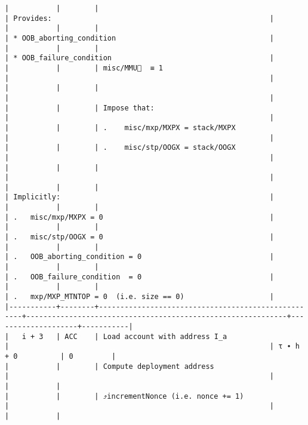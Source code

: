 \documentclass[varwidth=\maxdimen,margin=0.5cm,multi={verbatim}]{standalone}
\begin{document}
\begin{verbatim}
|           |        |                                                    | Provides:                                                   |
|           |        |                                                    | * OOB_aborting_condition                                    |
|           |        |                                                    | * OOB_failure_condition                                     |
|           |        | misc/MMU🚩  ≡ 1                                    |                                                             |
|           |        |                                                    |                                                             |
|           |        | Impose that:                                       |                                                             |
|           |        | .    misc/mxp/MXPX = stack/MXPX                    |                                                             |
|           |        | .    misc/stp/OOGX = stack/OOGX                    |                                                             |
|           |        |                                                    |                                                             |
|           |        |                                                    | Implicitly:                                                 |
|           |        |                                                    | .   misc/mxp/MXPX = 0                                       |
|           |        |                                                    | .   misc/stp/OOGX = 0                                       |
|           |        |                                                    | .   OOB_aborting_condition = 0                              |
|           |        |                                                    | .   OOB_failure_condition  = 0                              |
|           |        |                                                    | .   mxp/MXP_MTNTOP = 0  (i.e. size == 0)                    |
|-----------+--------+----------------------------------------------------+-------------------------------------------------------------+--------------------+-----------|
|   i + 3   | ACC    | Load account with address I_a                      |                                                             | τ ∙ h + 0          | 0         |
|           |        | Compute deployment address                         |                                                             |                    |           |
|           |        | ⤴️incrementNonce (i.e. nonce += 1)                 |                                                             |                    |           |

\end{verbatim}
\end{document}

